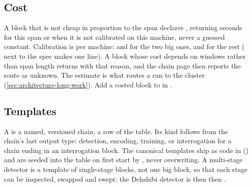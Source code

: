 \subsection{Cost}
A block that is not cheap in proportion to the span declares , returning seconds for
this span or  when it is not calibrated on this machine, never a guessed constant.
Calibration is per machine:  and
 for the two big ones, and
 for the rest ( next
to the spec makes  one line). A block whose cost depends on windows rather than span
length returns  with that reason, and the chain page then reports the route as unknown.
The estimate is what routes a run to the cluster (\cref{sec:architecture-long-work}). Add a costed
block to  in .

\subsection{Templates}
A  is a named, versioned chain, a row of the  table. Its
kind follows from the chain's last output type: detection, encoding, training, or interrogation for
a chain ending in an interrogation block. The canonical templates ship as code in
 () and are seeded into the table on first start by
, never overwriting. A multi-stage detector is a template of single-stage
blocks, not one big block, so that each stage can be inspected, swapped and swept: the Dehshibi
detector is  then 
then .

